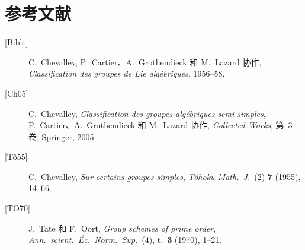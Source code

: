 \section*{参考文献}
\begin{sloppypar}
\begin{description}
\item[{[Bible]}]
C.~Chevalley, P.~Cartier、A.~Grothendieck 和 M.~Lazard 协作,
\textit{Classification des groupes de Lie algébriques}, 1956--58.
\item[{[Ch05]}]
C.~Chevalley,
\textit{Classification des groupes algébriques semi-simples}, P.~Cartier、A.~Grothendieck 和 M.~Lazard 协作,
\textit{Collected Works}, 第~3 卷, Springer, 2005.
\item[{[Tô55]}]
C.~Chevalley, \textit{Sur certains groupes simples},
\textit{Tôhoku Math.\ J.}\ (2) \textbf{7} (1955), 14--66.
\item[{[TO70]}]
J.~Tate 和 F.~Oort, \textit{Group schemes of prime order},
\textit{Ann.\ scient.\ Éc.\ Norm.\ Sup.}\ (4), t.~\textbf{3}
(1970), 1--21.
\end{description}
\end{sloppypar}
